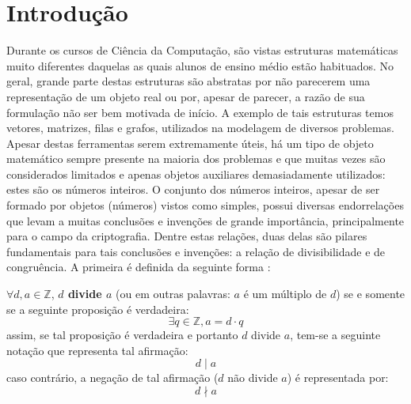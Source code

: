\chapter[Introdução]{Introdução}

\label{chap:intro}

Durante os cursos de Ciência da Computação, são vistas estruturas matemáticas muito diferentes daquelas as quais alunos de ensino médio estão habituados. No geral, grande parte destas estruturas são abstratas por não parecerem uma representação de um objeto real ou por, apesar de parecer, a razão de sua formulação não ser bem motivada de início. A exemplo de tais estruturas temos vetores, matrizes, filas e grafos, utilizados na modelagem de diversos problemas. Apesar destas ferramentas serem extremamente úteis, há um tipo de objeto matemático sempre presente na maioria dos problemas e que muitas vezes são considerados limitados e apenas objetos auxiliares demasiadamente utilizados: estes são os números inteiros. O conjunto dos números inteiros, apesar de ser formado por objetos (números) vistos como simples, possui diversas endorrelações que levam a muitas conclusões e invenções de grande importância, principalmente para o campo da criptografia. Dentre estas relações, duas delas são pilares fundamentais para tais conclusões e invenções: a relação de divisibilidade e de congruência. A primeira é definida da seguinte forma \cite{book:2399854}:
\\
\begin{definição}
        $\forall d, a \in \mathbb{Z}$, \textbf{$d$ divide $a$} (ou em outras palavras: $a$ é um múltiplo de $d$) se e somente se a seguinte proposição é verdadeira:
    \begin{equation*}
        \exists q \in \mathbb{Z}, a = d \cdot q
    \end{equation*}
    assim, se tal proposição é verdadeira e portanto $d$ divide $a$, tem-se a seguinte notação que representa tal afirmação:
    \begin{equation*}
        d \mid a
    \end{equation*}
    caso contrário, a negação de tal afirmação ($d$ não divide $a$) é representada por:
    \begin{equation*}
        d \nmid a
    \end{equation*}
\end{definição}

